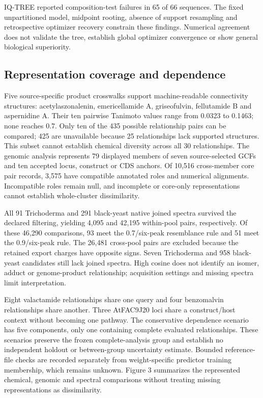 \documentclass[
  10pt,
  a4paper,
]{article}
\newcounter{none} %
\begin{document}
IQ-TREE reported composition-test failures in 65 of 66 sequences. The fixed unpartitioned model, midpoint rooting, absence of support resampling and retrospective optimizer recovery constrain these findings. Numerical agreement does not validate the tree, establish global optimizer convergence or show general biological superiority.

\subsection{Representation coverage and dependence}\label{representation-coverage-and-dependence}

Five source-specific product crosswalks support machine-readable connectivity structures: acetylaszonalenin, emericellamide A, griseofulvin, fellutamide B and aspernidine A. Their ten pairwise Tanimoto values range from 0.0323 to 0.1463; none reaches 0.7. Only ten of the 435 possible relationship pairs can be compared; 425 are unavailable because 25 relationships lack supported structures. This subset cannot establish chemical diversity across all 30 relationships. The genomic analysis represents 79 displayed members of seven source-selected GCFs and ten accepted locus, construct or CDS anchors. Of 10,516 cross-member core pair records, 3,575 have compatible annotated roles and numerical alignments. Incompatible roles remain null, and incomplete or core-only representations cannot establish whole-cluster dissimilarity.

All 91 Trichoderma and 291 black-yeast native joined spectra survived the declared filtering, yielding 4,095 and 42,195 within-pool pairs, respectively. Of these 46,290 comparisons, 93 meet the 0.7/six-peak resemblance rule and 51 meet the 0.9/six-peak rule. The 26,481 cross-pool pairs are excluded because the retained export charges have opposite signs. Seven Trichoderma and 958 black-yeast candidates still lack joined spectra. High cosine does not identify an isomer, adduct or genome-product relationship; acquisition settings and missing spectra limit interpretation.

Eight valactamide relationships share one query and four benzomalvin relationships share another. Three AtFAC9J20 loci share a construct/host context without becoming one pathway. The conservative dependence scenario has five components, only one containing complete evaluated relationships. These scenarios preserve the frozen complete-analysis group and establish no independent holdout or between-group uncertainty estimate. Bounded reference-file checks are recorded separately from weight-specific predictor training membership, which remains unknown. Figure 3 summarizes the represented chemical, genomic and spectral comparisons without treating missing representations as dissimilarity.
\end{document}
